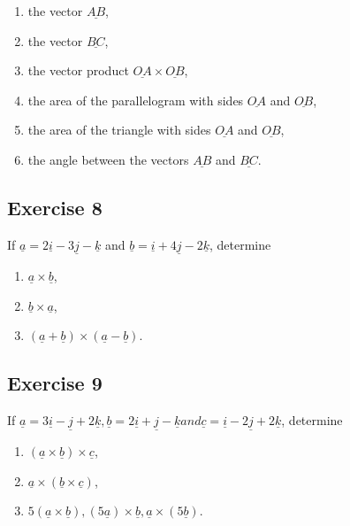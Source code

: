 \documentclass[
  11pt,
  oneside]{book}
\providecommand{\tightlist}{%
  \setlength{\itemsep}{0pt}\setlength{\parskip}{0pt}}
\newcommand{\slide}{}
\theoremstyle{definition}
\theoremstyle{definition}
\theoremstyle{definition}
\theoremstyle{definition}
\theoremstyle{remark}
\begin{document}
\begin{enumerate}
\def\labelenumi{\arabic{enumi}.}
\tightlist
\item
  the vector \(\underline{AB}\),
\item
  the vector \(\underline{BC}\),
\item
  the vector product \(\underline{OA} \times \underline{OB}\),
\item
  the area of the parallelogram with sides \(\underline{OA}\) and \(\underline{OB}\),
\item
  the area of the triangle with sides \(\underline{OA}\) and \(\underline{OB}\),
\item
  the angle between the vectors \(\underline{AB}\) and \(\underline{BC}\).
\end{enumerate}

\slide

\subsection*{Exercise 8}\label{exercise-8-2}

If \(\underline{a} = 2\underline{i} - 3\underline{j} - \underline{k}\) and \(\underline{b} = \underline{i} + 4\underline{j} - 2\underline{k}\), determine

\begin{enumerate}
\def\labelenumi{\arabic{enumi}.}
\tightlist
\item
  \(\underline{a} \times \underline{b}\),
\item
  \(\underline{b} \times \underline{a}\),
\item
  \((\underline{a} + \underline{b}) \times (\underline{a} - \underline{b})\).
\end{enumerate}

\slide

\subsection*{Exercise 9}\label{exercise-9-2}

If \(\underline{a} = 3\underline{i} - \underline{j} + 2\underline{k}, \underline{b} = 2\underline{i} + \underline{j} - \underline{k} and \underline{c} = \underline{i} - 2\underline{j} + 2\underline{k}\), determine

\begin{enumerate}
\def\labelenumi{\arabic{enumi}.}
\tightlist
\item
  \((\underline{a} \times \underline{b}) \times \underline{c}\),
\item
  \(\underline{a} \times (\underline{b} \times \underline{c})\),
\item
  \(5(\underline{a} \times \underline{b}), (5\underline{a})\times \underline{b}, \underline{a}\times(5\underline{b})\).
\end{enumerate}
\end{document}
